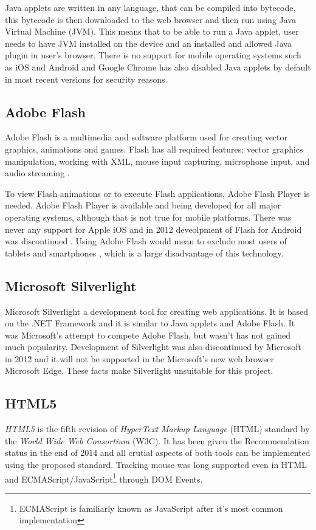 Java applets are written in any language, that can be compiled into bytecode, this bytecode is then downloaded to the web browser and then run using Java Virtual Machine (JVM). This means that to be able to run a Java applet, user needs to have JVM installed on the device and an installed and allowed Java plugin in user's browser. There is no support for mobile operating systems such as iOS and Android \cite{java_mobile} and Google Chrome has also disabled Java applets by default in most recent versions for security reasons.

\subsection{Adobe Flash}
Adobe Flash is a multimedia and software platform used for creating vector graphics, animations and games. Flash has all required features: vector graphics manipulation, working with XML, mouse input capturing, microphone input, and audio streaming \cite{flash}. 

To view Flash animations or to execute Flash applications, Adobe Flash Player is needed. Adobe Flash Player is available and being developed for all major operating systems, although that is not true for mobile platforms. There was never any support for Apple iOS \cite{steve_jobs} and in 2012 deveolpment of Flash for Android was discontinued \cite{flash_mobile}. Using Adobe Flash would mean to exclude most users of tablets and smartphones \cite{mobile_statistics}, which is a large disadvantage of this technology.

\subsection{Microsoft Silverlight}
Microsoft Silverlight \cite{silverlight} a development tool for creating web applications. It is based on the .NET Framework and it is similar to Java applets and Adobe Flash. It was Microsoft's attempt to compete Adobe Flash, but wasn't has not gained much popularity. Development of Silverlight was also discontinued by Microsoft in 2012 and it will not be supported in the Microsoft's new web browser Microsoft Edge\cite{silverlight_is_dead}. These facts make Silverlight unsuitable for this project.


\subsection{HTML5}
\textit{HTML5} is the fifth revision of \textit{HyperText Markup Language} (HTML) standard by the \textit{World Wide Web Consortium} (W3C). It has been given the Recommendation status in the end of 2014 and all crutial aspects of both tools can be implemented using the proposed standard. Tracking mouse was long supported even in HTML and ECMAScript/JavaScript\footnote{ECMAScript is familiarly known as JavaScript after it's most common implementation\cite{javascript_vs_ecmascript}} through DOM Events\cite{dom_mouse_events}.

